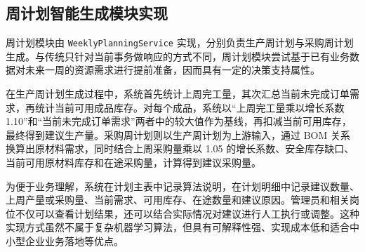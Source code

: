 \subsection{周计划智能生成模块实现}

周计划模块由 \texttt{WeeklyPlanningService} 实现，分别负责生产周计划与采购周计划生成。与传统只针对当前事务做响应的方式不同，周计划模块尝试基于已有业务数据对未来一周的资源需求进行提前准备，因而具有一定的决策支持属性。

在生产周计划生成过程中，系统首先统计上周完工量，其次汇总当前未完成订单需求，再统计当前可用成品库存。对每个成品，系统以“上周完工量乘以增长系数 1.10”和“当前未完成订单需求”两者中的较大值作为基线，再扣减当前可用库存，最终得到建议生产量。采购周计划则以生产周计划为上游输入，通过 BOM 关系换算出原材料需求，同时结合上周采购量乘以 1.05 的增长系数、安全库存缺口、当前可用原材料库存和在途采购量，计算得到建议采购量。

为便于业务理解，系统在计划主表中记录算法说明，在计划明细中记录建议数量、上周产量或采购量、当前需求、可用库存、在途数量和建议原因。管理员和相关岗位不仅可以查看计划结果，还可以结合实际情况对建议进行人工执行或调整。这种实现方式虽然不属于复杂机器学习算法，但具有可解释性强、实现成本低和适合中小型企业业务落地等优点。

